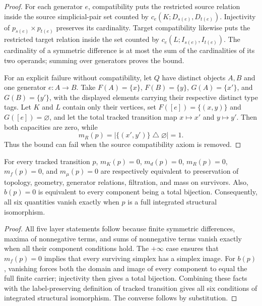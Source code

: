\begin{proof}
For each generator $e$, compatibility puts the restricted source relation
inside the source simplicial-pair set counted by $c_e(K;D_{s(e)},D_{t(e)})$.
Injectivity of $p_{s(e)}\times p_{t(e)}$ preserves its cardinality. Target
compatibility likewise puts the restricted target relation inside the set
counted by $c_e(L;I_{s(e)},I_{t(e)})$. The cardinality of a symmetric
difference is at most the sum of the cardinalities of its two operands; summing
over generators proves the bound.

For an explicit failure without compatibility, let $Q$ have distinct objects
$A,B$ and one generator $e:A\to B$. Take $F(A)=\{x\}$,
$F(B)=\{y\}$, $G(A)=\{x'\}$, and $G(B)=\{y'\}$, with the displayed
elements carrying their respective distinct type tags. Let $K$ and $L$ contain
only their vertices, set $F([e])=\{(x,y)\}$ and $G([e])=\varnothing$, and let
the total tracked transition map $x\mapsto x'$ and $y\mapsto y'$. Then both
capacities are zero, while
\[
m_R(p)=|\{(x',y')\}\mathbin{\triangle}\varnothing|=1.
\]
Thus the bound can fail when the source compatibility axiom is removed.
\end{proof}

\begin{proposition}
For every tracked transition $p$, $m_K(p)=0$, $m_d(p)=0$, $m_R(p)=0$,
$m_f(p)=0$, and $m_\mu(p)=0$ are respectively equivalent to preservation of
topology, geometry, generator relations, filtration, and mass on survivors.
Also, $b(p)=0$ is equivalent to every component being a total bijection.
Consequently, all six quantities vanish exactly when $p$ is a full integrated
structural isomorphism.
\end{proposition}

\begin{proof}
All five layer statements follow because finite symmetric differences, maxima of nonnegative terms, and sums of nonnegative terms vanish
exactly when all their component conditions hold. The $+\infty$ case ensures
that $m_f(p)=0$ implies that every surviving simplex has a simplex image. For
$b(p)$, vanishing forces both the domain and image of every component to equal
the full finite carrier; injectivity then gives a total bijection. Combining
these facts with the label-preserving definition of tracked transition gives all
six conditions of integrated structural isomorphism. The converse follows by
substitution.
\end{proof}

